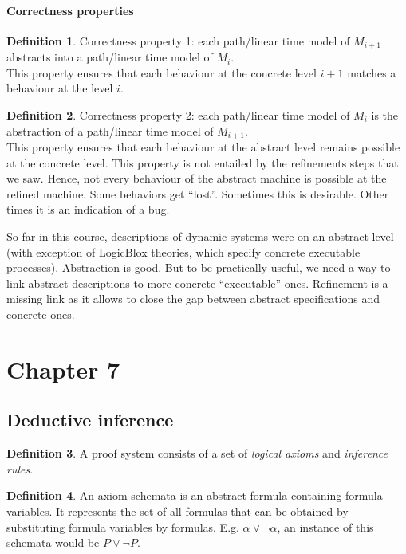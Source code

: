 \documentclass[10pt,a4paper]{article}
\theoremstyle{definition}
\newtheorem{definition}{Definition}[section]
\begin{document}
\paragraph{Correctness properties}

\begin{definition}
Correctness property 1: each path/linear time model of $M_{i+1}$ abstracts into a path/linear time model of $M_{i}$. \\

This property ensures that each behaviour at the concrete level $i + 1$ matches a behaviour at
the level $i$.
\end{definition}

\begin{definition}
Correctness property 2: each path/linear time model of $M_{i}$ is the abstraction of a path/linear time model of $M_{i + 1}$. \\

This property ensures that each behaviour at the abstract level remains possible at the concrete level. This property is not entailed by the refinements steps that we saw. Hence, not every behaviour of the abstract machine is possible at the refined machine. Some behaviors get “lost”. Sometimes this is desirable. Other times it is an indication of a bug.
\end{definition}

So far in this course, descriptions of dynamic systems were on an abstract level (with exception of LogicBlox theories, which specify concrete executable processes). Abstraction is good. But to be practically useful, we need a way to link abstract descriptions to more concrete “executable” ones. Refinement is a missing link as it allows to close the gap between abstract specifications and concrete ones.


\section{Chapter 7}

\subsection{Deductive inference}

\begin{definition}
A proof system consists of a set of \textit{logical axioms} and \textit{inference rules}.
\end{definition}

\begin{definition}
An axiom schemata is an abstract formula containing formula variables. It represents the set of all formulas that can be obtained by substituting formula variables by formulas. E.g. $\alpha \lor \lnot\alpha$, an instance of this schemata would be $P \lor \lnot P$.
\end{definition}
\end{document}
